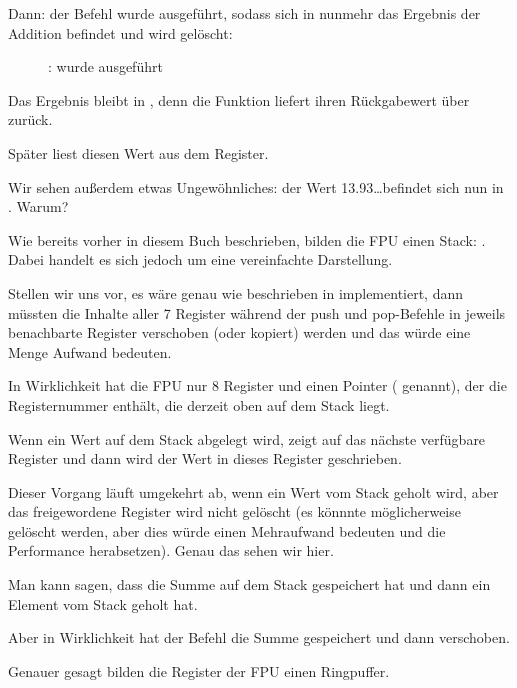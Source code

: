 \clearpage
Dann: der Befehl \FADDP wurde ausgeführt, sodass sich in  nunmehr das
Ergebnis der Addition befindet und  wird gelöscht:

\begin{figure}[H]
\centering
{}
\caption{\olly: \FADDP wurde ausgeführt}
\label{fig:FPU_simple_olly_5}
\end{figure}
Das Ergebnis bleibt in , denn die Funktion liefert ihren Rückgabewert über
 zurück.

Später liest \main diesen Wert aus dem Register.

Wir sehen außerdem etwas Ungewöhnliches: der Wert 13.93\ldots befindet sich nun
in . Warum?

\label{FPU_is_rather_circular_buffer}
Wie bereits vorher in diesem Buch beschrieben, bilden die \ac{FPU} einen Stack:
. Dabei handelt es sich jedoch um eine vereinfachte
Darstellung.

Stellen wir uns vor, es wäre genau wie beschrieben in 
implementiert, dann müssten die Inhalte aller 7 Register während der push und
pop-Befehle in jeweils benachbarte Register verschoben (oder kopiert) werden und
das würde eine Menge Aufwand bedeuten.

In Wirklichkeit hat die \ac{FPU} nur 8 Register und einen Pointer (
genannt), der die Registernummer enthält, die derzeit oben auf dem Stack liegt.

Wenn ein Wert auf dem Stack abgelegt wird, zeigt  auf das nächste
verfügbare Register und dann wird der Wert in dieses Register geschrieben.

Dieser Vorgang läuft umgekehrt ab, wenn ein Wert vom Stack geholt wird, aber das
freigewordene Register wird nicht gelöscht (es könnnte möglicherweise gelöscht
werden, aber dies würde einen Mehraufwand bedeuten und die Performance
herabsetzen). 
Genau das sehen wir hier.

Man kann sagen, dass \FADDP die Summe auf dem Stack gespeichert hat und dann ein
Element vom Stack geholt hat.

Aber in Wirklichkeit hat der Befehl die Summe gespeichert und dann 
verschoben.

Genauer gesagt bilden die Register der \ac{FPU} einen Ringpuffer. 
